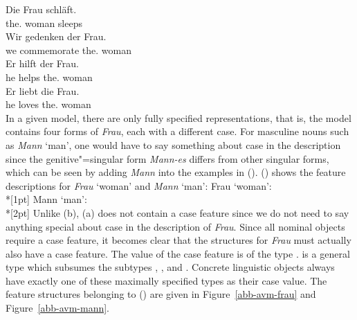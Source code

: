 \eal\settowidth{}
\ex 
\gll Die        Frau schläft. \\      
     the.\nom{} woman sleeps\\
\ex 
\gll Wir gedenken der Frau. \\ 
     we commemorate the.\gen{} woman\\
\ex 
\gll Er hilft der Frau.  \\    
     he helps the.\dat{} woman\\
\ex 
\gll Er liebt die Frau.   \\   
     he loves the.\acc{} woman\\
\zl
In a given model, there are only fully specified representations, that is, the model contains four forms of \emph{Frau}, each with a different case.
For masculine nouns such as \emph{Mann} `man', one would have to say something about case in the description since the genitive"=singular form \emph{Mann-es}
differs from other singular forms, which can be seen by adding \emph{Mann} into the examples in (). () shows the feature descriptions for
\emph{Frau} `woman' and \emph{Mann} `man':
\eal
\ex\label{avm-frau}
Frau `woman':\\*[1pt]
\ex\label{avm-mann}
Mann `man':\\*[2pt]
\zl
\addlines
Unlike (b), (a) does not contain a case feature since we do not need to say anything special about case in the description of \emph{Frau}.
Since all nominal objects require a case feature, it becomes clear that the structures for \emph{Frau} must actually also have a case feature.
The value of the case feature is of the type .  is a general type which subsumes the subtypes , ,
 and . Concrete linguistic objects always have exactly one of these maximally specified types as their case value. The feature structures
belonging to () are given in Figure~\ref{abb-avm-frau} and Figure~\ref{abb-avm-mann}.%

